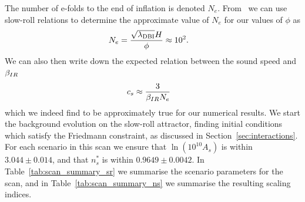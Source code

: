     The number of e-folds to the end of inflation is denoted $N_e$.
    From~\cite{Chen_dbi} we can use slow-roll relations to determine the approximate
    value of $N_e$
    for our values of $\phi$ as
    \begin{align}
        N_e &= \frac{\sqrt{\lambda_{\dbi}}H}{\phi}\approx10^2.%
    \end{align}
    We can also then write down the expected relation between the sound speed
    and $\beta_{IR}$
    \begin{align}
        c_s &\approx \frac{3}{\bir N_e}%
    \end{align}
    which we indeed find to be approximately true for our numerical results.
    We start the background evolution on the slow-roll attractor, finding initial conditions which
    satisfy the Friedmann constraint, as discussed in Section~\ref{sec:interactions}.
    For each scenario in this scan we ensure that $\ln\left(10^{10}A_s\right)$
    is within $3.044\pm0.014$,
    and that $n_s^{*}$ is within $0.9649\pm0.0042$.
    In Table~\ref{tab:scan_summary_sr} we summarise the scenario parameters for the scan,
    and in Table~\ref{tab:scan_summary_ns} we summarise the resulting scaling indices.
 


